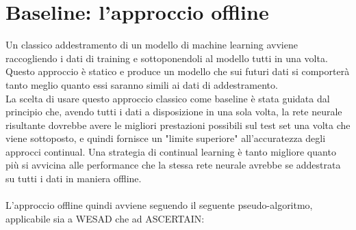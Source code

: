 \section{Baseline: l'approccio offline}
Un classico addestramento di un modello di machine learning avviene raccogliendo i dati di training e sottoponendoli al modello tutti in una volta. Questo approccio è statico e produce un modello che sui futuri dati si comporterà tanto meglio quanto essi saranno simili ai dati di addestramento.\\
La scelta di usare questo approccio classico come baseline è stata guidata dal principio che, avendo tutti i dati a disposizione in una sola volta, la rete neurale risultante dovrebbe avere le migliori prestazioni possibili sul test set una volta che viene sottoposto, e quindi fornisce un "limite superiore" all'accuratezza degli approcci continual. Una strategia di continual learning è tanto migliore quanto più si avvicina alle performance che la stessa rete neurale avrebbe se addestrata su tutti i dati in maniera offline.\\\\
L'approccio offline quindi avviene seguendo il seguente pseudo-algoritmo, applicabile sia a WESAD che ad ASCERTAIN:
